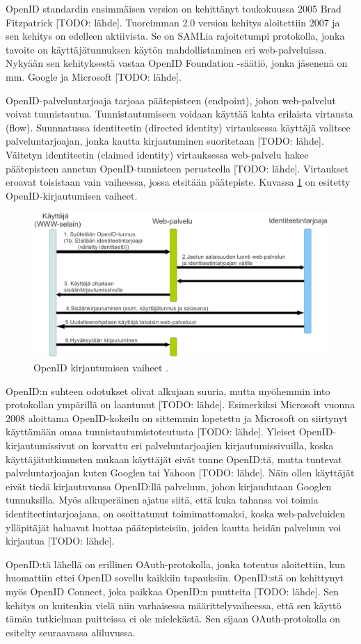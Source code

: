 OpenID standardin ensimmäisen version on kehittänyt toukokuussa 2005 Brad Fitzpatrick [TODO: lähde]. Tuoreimman 2.0 version kehitys aloitettiin 2007 ja sen kehitys on edelleen aktiivista. Se on SAMLia rajoitetumpi protokolla, jonka tavoite on käyttäjätunnuksen käytön mahdollistaminen eri web-palveluissa. Nykyään sen kehityksestä vastaa OpenID Foundation -säätiö, jonka jäsenenä on mm. Google ja Microsoft [TODO: lähde].

OpenID-palveluntarjoaja tarjoaa päätepisteen (endpoint), johon web-palvelut voivat tunnistautua. Tunnistautumiseen voidaan käyttää kahta erilaista virtausta (flow).  Suunnatussa identiteetin (directed identity) virtauksessa käyttäjä valitsee palveluntarjoajan, jonka kautta kirjautuminen suoritetaan [TODO: lähde]. Väitetyn identiteetin (claimed identity) virtauksessa web-palvelu hakee päätepisteen annetun OpenID-tunnisteen perusteella [TODO: lähde]. Virtaukset eroavat toisistaan vain vaiheessa, jossa etsitään päätepiste. Kuvassa \ref{openid_flow} on esitetty OpenID-kirjautumisen vaiheet.

\begin{figure}[ht]
\centering
\includegraphics[width=\textwidth]{teknologiat/protokollat/openid.eps}
\caption{OpenID kirjautumisen vaiheet \cite{openid}.}%
\label{openid_flow}
\end{figure}

OpenID:n suhteen odotukset olivat alkujaan suuria, mutta myöhemmin into protokollan ympärillä on laantunut [TODO: lähde]. Esimerkiksi Microsoft vuonna 2008 aloittama OpenID-kokeilu on sittemmin lopetettu ja Microsoft on siirtynyt käyttämään omaa tunnistautumistoteutusta [TODO: lähde]. Yleiset OpenID-kirjautumissivut on korvattu eri palveluntarjoajien kirjautumissivuilla, koska käyttäjätutkimusten mukaan käyttäjät eivät tunne OpenID:tä, mutta tuntevat palveluntarjoajan kuten Googlen tai Yahoon [TODO: lähde]. Näin ollen käyttäjät eivät tiedä kirjautuvansa OpenID:llä palveluun, johon kirjaudutaan Googlen tunnuksilla. Myös alkuperäinen ajatus siitä, että kuka tahansa voi toimia identiteetintarjoajana, on osoittatunut toimimattomaksi, koska web-palveluiden ylläpitäjät haluavat luottaa päätepisteisiin, joiden kautta heidän palveluun voi kirjautua [TODO: lähde].

OpenID:tä lähellä on erillinen OAuth-protokolla, jonka toteutus aloitettiin, kun huomattiin ettei OpenID sovellu kaikkiin tapauksiin. OpenID:stä on kehittynyt myös OpenID Connect, joka paikkaa OpenID:n puutteita [TODO: lähde]. Sen kehitys on kuitenkin vielä niin varhaisessa määrittelyvaiheessa, että sen käyttö tämän tutkielman puitteissa ei ole mielekästä. Sen sijaan OAuth-protokolla on esitelty seuraavassa aliluvussa.